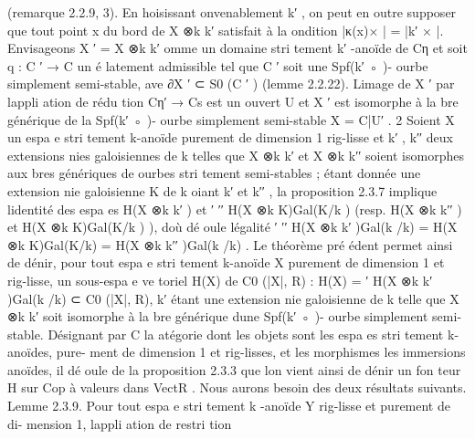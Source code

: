 \documentclass[
  10pt,
]{article}
\newenvironment{Shaded}{}{}
\newcommand{\NormalTok}[1]{#1}
\begin{document}
\begin{Shaded}
\begin{Highlighting}[]
\NormalTok{(remarque 2.2.9, 3). En hoisissant onvenablement k′ , on peut en outre supposer que tout}
\NormalTok{point x du bord de X ⊗k k′ satisfait à la ondition |κ(x)× | = |k′ × |.}
\NormalTok{    Envisageons X ′ = X ⊗k k′ omme un domaine stri tement k′ {-}anoïde de Cη et soit q :}
\NormalTok{C ′ → C un é latement admissible tel que C ′ soit une Spf(k′ ◦ ){-} ourbe simplement semi{-}stable,}
\NormalTok{ave ∂X ′ ⊂ S0 (C ′ ) (lemme 2.2.22). L\textquotesingle{}image de X ′ par l\textquotesingle{}appli ation de rédu tion Cη′ → Cs}
\NormalTok{est un ouvert U et X ′ est isomorphe à la bre générique de la Spf(k′ ◦ ){-} ourbe simplement}
\NormalTok{semi{-}stable X = C|U′ .                                                                       2}
\NormalTok{  Soient X un espa e stri tement k{-}anoïde purement de dimension 1 rig{-}lisse et k′ , k′′ deux}
\NormalTok{extensions nies galoisiennes de k telles que X ⊗k k′ et X ⊗k k′′ soient isomorphes aux bres}
\NormalTok{génériques de ourbes stri tement semi{-}stables ; étant donnée une extension nie galoisienne}
\NormalTok{K de k oiant k′ et k′′ , la proposition 2.3.7 implique l\textquotesingle{}identité des espa es H(X ⊗k k′ ) et}
\NormalTok{                   ′                                          ′′}
\NormalTok{H(X ⊗k K)Gal(K/k ) (resp. H(X ⊗k k′′ ) et H(X ⊗k K)Gal(K/k ) ), d\textquotesingle{}où dé oule l\textquotesingle{}égalité}
\NormalTok{                               ′                                              ′′}
\NormalTok{              H(X ⊗k k′ )Gal(k /k) = H(X ⊗k K)Gal(K/k) = H(X ⊗k k′′ )Gal(k /k) .}
\NormalTok{Le théorème pré édent permet ainsi de dénir, pour tout espa e stri tement k{-}anoïde X}
\NormalTok{purement de dimension 1 et rig{-}lisse, un sous{-}espa e ve toriel H(X) de C0 (|X|, R) : H(X) =}
\NormalTok{                ′}
\NormalTok{H(X ⊗k k′ )Gal(k /k) ⊂ C0 (|X|, R), k′ étant une extension nie galoisienne de k telle que X ⊗k k′}
\NormalTok{soit isomorphe à la bre générique d\textquotesingle{}une Spf(k′ ◦ ){-} ourbe simplement semi{-}stable.}
\NormalTok{   Désignant par C la atégorie dont les objets sont les espa es stri tement k{-}anoïdes, pure{-}}
\NormalTok{ment de dimension 1 et rig{-}lisses, et les morphismes les immersions anoïdes, il dé oule de la}
\NormalTok{proposition 2.3.3 que l\textquotesingle{}on vient ainsi de dénir un fon teur H sur Cop à valeurs dans VectR .}
\NormalTok{  Nous aurons besoin des deux résultats suivants.}
\NormalTok{Lemme 2.3.9.  Pour tout espa e stri tement k {-}anoïde Y rig{-}lisse et purement de di{-}}
\NormalTok{mension 1, l\textquotesingle{}appli ation de restri tion}

\end{Highlighting}
\end{Shaded}
\end{document}
